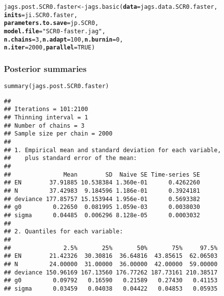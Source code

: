 \documentclass[color=usenames,dvipsnames]{beamer}\usepackage[]{graphicx}\usepackage[]{xcolor}
\makeatletter
\newcommand{\hlnum}[1]{\textcolor[rgb]{0.69,0.494,0}{#1}}%
\newcommand{\hlsng}[1]{\textcolor[rgb]{0.749,0.012,0.012}{#1}}%
\newcommand{\hldef}[1]{\textcolor[rgb]{0,0,0}{#1}}%
\newcommand{\hlkwb}[1]{\textcolor[rgb]{0,0.341,0.682}{#1}}%
\newcommand{\hlkwc}[1]{\textcolor[rgb]{0,0,0}{\textbf{#1}}}%
\newcommand{\hlkwd}[1]{\textcolor[rgb]{0.004,0.004,0.506}{#1}}%
\newenvironment{kframe}{%
 \def\at@end@of@kframe{}%
 \ifinner\ifhmode%
  \def\at@end@of@kframe{\end{minipage}}%
  \begin{minipage}{\columnwidth}%
 \fi\fi%
 \def\FrameCommand##1{\hskip\@totalleftmargin \hskip-\fboxsep
 \colorbox{shadecolor}{##1}\hskip-\fboxsep
     \hskip-\linewidth \hskip-\@totalleftmargin \hskip\columnwidth}%
 \MakeFramed {\advance\hsize-\width
   \@totalleftmargin\z@ \linewidth\hsize
   \@setminipage}}%
 {\par\unskip\endMakeFramed%
 \at@end@of@kframe}
\newenvironment{knitrout}{}{} %
\makeatother
\begin{document}
\begin{frame}[fragile]
\begin{knitrout}
\begin{kframe}
\begin{alltt}
\hldef{jags.post.SCR0.faster} \hlkwb{<-} \hlkwd{jags.basic}\hldef{(}\hlkwc{data}\hldef{=jags.data.SCR0.faster,}
                                    \hlkwc{inits}\hldef{=ji.SCR0.faster,}
                                    \hlkwc{parameters.to.save}\hldef{=jp.SCR0,}
                                    \hlkwc{model.file}\hldef{=}\hlsng{"SCR0-faster.jag"}\hldef{,}
                                    \hlkwc{n.chains}\hldef{=}\hlnum{3}\hldef{,} \hlkwc{n.adapt}\hldef{=}\hlnum{100}\hldef{,} \hlkwc{n.burnin}\hldef{=}\hlnum{0}\hldef{,}
                                    \hlkwc{n.iter}\hldef{=}\hlnum{2000}\hldef{,} \hlkwc{parallel}\hldef{=}\hlnum{TRUE}\hldef{)}
\end{alltt}
\end{kframe}
\end{knitrout}
\end{frame}




\begin{frame}[fragile]
  \frametitle{Posterior summaries}
\begin{knitrout}\tiny
{}\color{fgcolor}\begin{kframe}
\begin{alltt}
\hlkwd{summary}\hldef{(jags.post.SCR0.faster)}
\end{alltt}
\begin{verbatim}
## 
## Iterations = 101:2100
## Thinning interval = 1 
## Number of chains = 3 
## Sample size per chain = 2000 
## 
## 1. Empirical mean and standard deviation for each variable,
##    plus standard error of the mean:
## 
##               Mean        SD  Naive SE Time-series SE
## EN        37.91885 10.538384 1.360e-01      0.4262260
## N         37.42983  9.184596 1.186e-01      0.3924181
## deviance 177.85757 15.153944 1.956e-01      0.5693382
## g0         0.22650  0.081995 1.059e-03      0.0038030
## sigma      0.04485  0.006296 8.128e-05      0.0003032
## 
## 2. Quantiles for each variable:
## 
##               2.5%       25%       50%       75%     97.5%
## EN        21.42326  30.30816  36.64816  43.85615  62.06503
## N         24.00000  31.00000  36.00000  42.00000  59.00000
## deviance 150.96169 167.13560 176.77262 187.73161 210.38517
## g0         0.09792   0.16590   0.21589   0.27430   0.41153
## sigma      0.03459   0.04038   0.04422   0.04853   0.05935
\end{verbatim}
\end{kframe}
\end{knitrout}
\end{frame}
\end{document}
